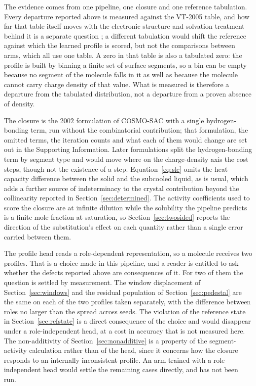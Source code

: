 The evidence comes from one pipeline, one closure and one reference tabulation. Every departure
reported above is measured against the VT-2005 table, and how far that table itself moves with the
electronic structure and solvation treatment behind it is a separate question
\cite{salih2025sigma}; a different tabulation would shift the reference against which the learned
profile is scored, but not the comparisons between arms, which all use one table. A zero in that
table is also a tabulated zero: the profile is built by binning a finite set of surface segments,
so a bin can be empty because no segment of the molecule falls in it as well as because the
molecule cannot carry charge density of that value. What is measured is therefore a departure from
the tabulated distribution, not a departure from a proven absence of density.

The closure is the $2002$ formulation of COSMO-SAC with a single hydrogen-bonding term, run
without the combinatorial contribution; that formulation, the omitted terms, the iteration counts
and what each of them would change are set out in the Supporting Information. Later formulations
split the hydrogen-bonding term by segment type and would move where on the charge-density axis
the cost steps, though not the existence of a step. Equation~\eqref{eq:sle} omits the
heat-capacity difference between the solid and the subcooled liquid, as is usual, which adds a
further source of indeterminacy to the crystal contribution beyond the collinearity reported in
Section~\ref{sec:determined}. The activity coefficients used to score the closure are at infinite
dilution while the solubility the pipeline predicts is a finite mole fraction at saturation, so
Section~\ref{sec:twosided} reports the direction of the substitution's effect on each quantity
rather than a single error carried between them.

The profile head reads a role-dependent representation, so a molecule receives two profiles. That
is a choice made in this pipeline, and a reader is entitled to ask whether the defects reported
above are consequences of it. For two of them the question is settled by measurement. The window
displacement of Section~\ref{sec:windows} and the residual population of
Section~\ref{sec:pedestal} are the same on each of the two profiles taken separately, with the
difference between roles no larger than the spread across seeds. The violation of the reference
state in Section~\ref{sec:refstate} is a direct consequence of the choice and would disappear
under a role-independent head, at a cost in accuracy that is not measured here. The non-additivity
of Section~\ref{sec:nonadditive} is a property of the segment-activity calculation rather than of
the head, since it concerns how the closure responds to an internally inconsistent profile. An arm
trained with a role-independent head would settle the remaining cases directly, and has not been
run.

